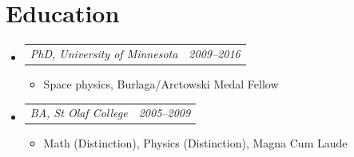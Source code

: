 \documentclass[12pt,letterpaper]{article}
\makeatletter
\newcommand{\headerpair}[2]{
    \begin{tabular*}{\linewidth}{l@{ \extracolsep{\fill} }r} {\large\emph{#1}} & {\large\emph{#2}}
    \end{tabular*}
}
\newcommand{\headerrow}[3]{\headerpair{#1, #2}{#3}}
\newcommand{\YearRange}[2]{#1--#2}
\newcommand{\ResumeSection}[1]{\section*{{\color{MidnightBlue}#1 \sout{\hfill}}}}
\makeatother
\begin{document}

\ResumeSection{Education}

\begin{itemize}[leftmargin=\parindent]
    \parskip=0.1em
    \itemsep=1.2em

    \item[]
        \headerrow
            {PhD}
            {University of Minnesota}
            {\YearRange{2009}{2016}}
        \begin{itemize}[leftmargin=\parindent]
            \item Space physics, Burlaga/Arctowski Medal Fellow
        \end{itemize}
    \item[]
        \headerrow
            {BA}
            {St Olaf College}
            {\YearRange{2005}{2009}}
        \begin{itemize}[leftmargin=\parindent]
            \item Math (Distinction), Physics (Distinction),
                 Magna Cum Laude
        \end{itemize}
\end{itemize}

\end{document}
